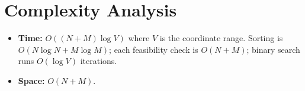 \documentclass[11pt,a4paper]{article}
\begin{document}
\section{Complexity Analysis}
\begin{itemize}
  \item \textbf{Time:} $O((N + M) \log V)$ where $V$ is the coordinate
        range. Sorting is $O(N \log N + M \log M)$; each feasibility
        check is $O(N + M)$; binary search runs $O(\log V)$ iterations.
  \item \textbf{Space:} $O(N + M)$.
\end{itemize}
\end{document}
